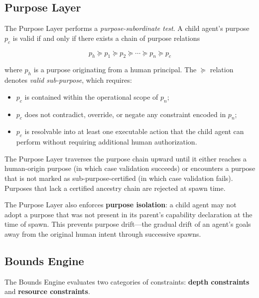 \subsection{Purpose Layer}

The Purpose Layer performs a \textit{purpose-subordinate test}. A child agent's purpose $p_c$ is valid if and only if there exists a chain of purpose relations

\[
p_h \succeq p_1 \succeq p_2 \succeq \cdots \succeq p_n \succeq p_c
\]

where $p_h$ is a purpose originating from a human principal. The $\succeq$ relation denotes \textit{valid sub-purpose}, which requires:

\begin{itemize}
\item $p_c$ is contained within the operational scope of $p_n$;
\item $p_c$ does not contradict, override, or negate any constraint encoded in $p_n$;
\item $p_c$ is resolvable into at least one executable action that the child agent can perform without requiring additional human authorization.
\end{itemize}

The Purpose Layer traverses the purpose chain upward until it either reaches a human-origin purpose (in which case validation succeeds) or encounters a purpose that is not marked as sub-purpose-certified (in which case validation fails). Purposes that lack a certified ancestry chain are rejected at spawn time.

The Purpose Layer also enforces \textbf{purpose isolation}: a child agent may not adopt a purpose that was not present in its parent's capability declaration at the time of spawn. This prevents purpose drift—the gradual drift of an agent's goals away from the original human intent through successive spawns.

\subsection{Bounds Engine}

The Bounds Engine evaluates two categories of constraints: \textbf{depth constraints} and \textbf{resource constraints}.

